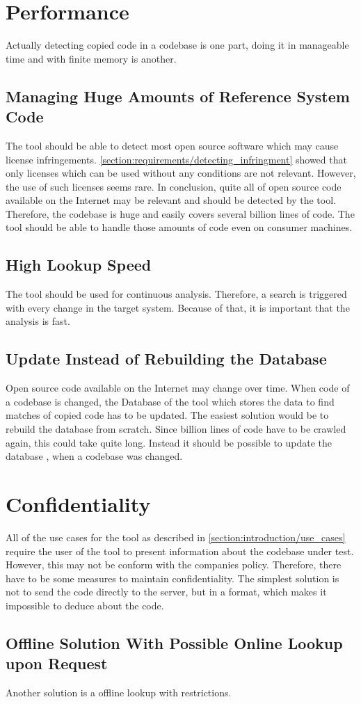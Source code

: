 \section{Performance}
Actually detecting copied code in a codebase is one part, doing it in manageable time and with finite memory is another.

\subsection{Managing Huge Amounts of Reference System Code}
The tool should be able to detect most open source software which may cause license infringements.
\autoref{section:requirements/detecting_infringment} showed that only licenses which can be used without any conditions are not relevant.
However, the use of such licenses seems rare.
In conclusion, quite all of open source code available on the Internet may be relevant and should be detected by the tool.
Therefore, the codebase is huge and easily covers several billion lines of code.
The tool should be able to handle those amounts of code even on consumer machines. %

\subsection{High Lookup Speed}
The tool should be used for continuous analysis.
Therefore, a search is triggered with every change in the target system.
Because of that, it is important that the analysis is fast.

\subsection{Update Instead of Rebuilding the Database}
Open source code available on the Internet may change over time.
When code of a codebase is changed, the Database of the tool which stores the data to find matches of copied code has to be updated.
The easiest solution would be to rebuild the database from scratch.
Since billion lines of code have to be crawled again, this could take quite long.
Instead it should be possible to update the database , when a codebase was changed.

\section{Confidentiality}
All of the use cases for the tool as described in \autoref{section:introduction/use_cases} require the user of the tool to present information about the codebase under test.
However, this may not be conform with the companies policy.
Therefore, there have to be some measures to maintain confidentiality.
The simplest solution is not to send the code directly to the server, but in a format, which makes it impossible to deduce about the code.

\subsection{Offline Solution With Possible Online Lookup upon Request} %
Another solution is a offline lookup with restrictions.
